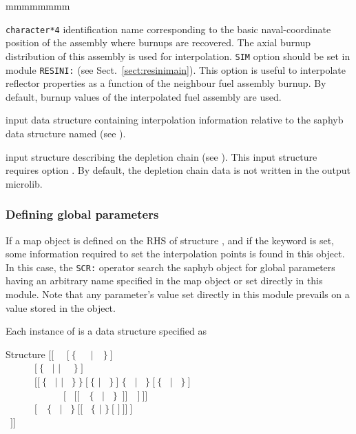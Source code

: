 \begin{ListeDeDescription}{mmmmmmmm}
\item[\dusa{naval}] {\tt character*4} identification name corresponding to the basic naval-coordinate position of the assembly where burnups are recovered. The axial burnup distribution of this assembly is
used for interpolation. {\tt SIM} option should be set in module {\tt RESINI:} (see Sect.~\ref{sect:resinimain}). This option is useful to interpolate reflector properties as a function of the
neighbour fuel assembly burnup. By default, burnup values of the interpolated fuel assembly are used.

\item[\dusa{descints}] input data structure containing interpolation information relative to the {\sc saphyb} data structure named  (see ).

\item[\dstr{descdepl}] input structure describing the depletion chain (see ). This input structure requires option . By
default, the depletion chain data is not written in the output {\sc microlib}.

\end{ListeDeDescription}

\subsubsection{Defining global parameters}\label{sect:descints}

\vskip -0.5cm

If a {\sc map} object is defined on the RHS of structure , and if the  keyword is set, some information required to set the interpolation points is found in this object.
In this case, the {\tt SCR:} operator search the {\sc saphyb} object for global parameters  having an arbitrary name specified in the {\sc map} object or set directly in this module.
Note that any parameter's value set directly in this module prevails on a value stored in the  object.

Each instance of  is a data structure specified as

\begin{DataStructure}{Structure }
$[[$~ ~$[~\{$~~~$|$~~$\}~]$ \\
~~~~~~$[~\{$~ $|$  $|$ ~~$\}~]$ \\
~~~~~~$[[~\{$~ $|$  $|$ ~$\}~\}~[~\{$  $|$ ~$\}~]$  $\{$~ $|$ ~$\}~[~\{$~ $|$ ~$\}~]$ \\
~~~~~~~~~~~~$[$~ $[[$~~$\{$~ $|$ ~$\}$~$]]$~~$]~]]$  \\
~~~~~~$[$~~$\{$~ $|$ ~$\}~[[$~ $\{$  $|$ \moc{*} $\}~[$  $]~]]~]$ \\
~$]]$
\end{DataStructure}

